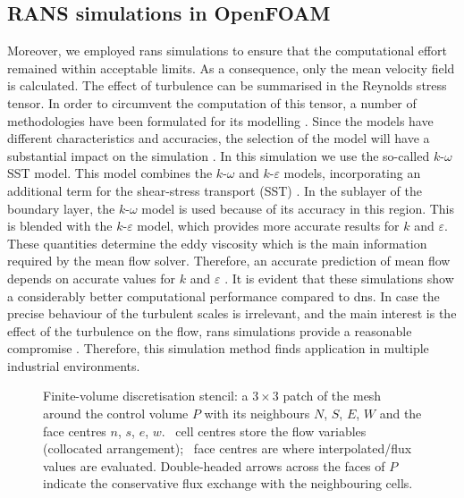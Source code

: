 \subsection{RANS simulations in OpenFOAM}\label{sec:RANSmethod}

Moreover, we employed \acrshort{rans} simulations to ensure that the computational effort remained within acceptable limits.
As a consequence, only the mean velocity field is calculated.
The effect of turbulence can be summarised in the Reynolds stress tensor.
In order to circumvent the computation of this tensor, a number of methodologies have been formulated for its modelling \citep{wilcox_turbulence_2006}. 
Since the models have different characteristics and accuracies, the selection of the model will have a substantial impact on the simulation \citep{yang_assessment_2016}.
In this simulation we use the so-called $k\text{-}\omega$ SST model.
This model combines the $k\text{-}\omega$ and $k\text{-}\varepsilon$ models, incorporating an additional term for the shear-stress transport (SST) \citep{menter_two-equation_1994}.
In the sublayer of the boundary layer, the $k\text{-}\omega$ model is used because of its accuracy in this region. 
This is blended with the $k\text{-}\varepsilon$ model, which provides more accurate results for $k$ and $\varepsilon$.
These quantities determine the eddy viscosity which is the main information required by the mean flow solver. 
Therefore, an accurate prediction of mean flow depends on accurate values for $k$ and $\varepsilon$ \citep{menter_two-equation_1994}.
It is evident that these simulations show a considerably better computational performance compared to \acrshort{dns}.
In case the precise behaviour of the turbulent scales is irrelevant, and the main interest is the effect of the turbulence on the flow, \acrshort{rans} simulations provide a reasonable compromise \citep{alfonsi_reynolds-averaged_2009}.
Therefore, this simulation method finds application in multiple industrial environments.


\begin{figure}[H]
    \centering
    
    \caption[Finite-volume stencil]{%
    Finite-volume discretisation stencil: a $3\times3$ patch of the mesh
    around the control volume $P$ with its neighbours $N$, $S$, $E$, $W$ and
    the face centres $n$, $s$, $e$, $w$.
    \centermark~cell centres store the flow variables (collocated arrangement);
    \facemark~face centres are where interpolated/flux values are evaluated.
    Double-headed arrows across the faces of $P$ indicate the conservative flux
    exchange with the neighbouring cells.}
    \label{fig:FVMMethod}
\end{figure}


